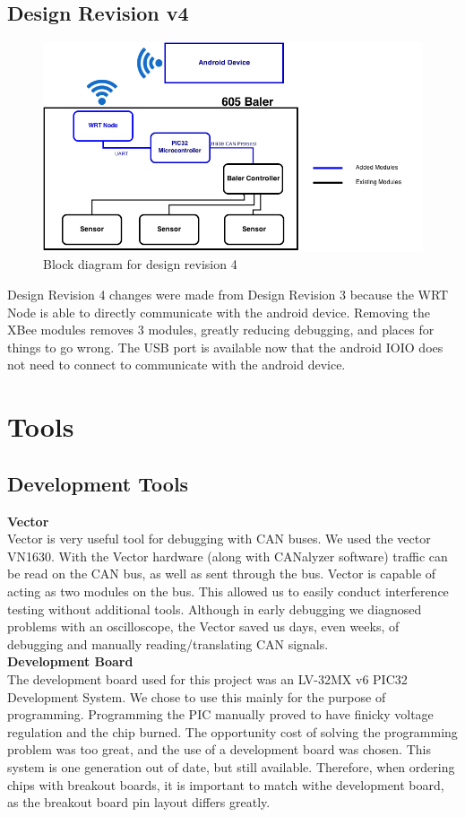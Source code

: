 \documentclass[paper=a4, fontsize=11pt]{scrartcl}
\numberwithin{equation}{section}		%
\numberwithin{figure}{section}			%
\numberwithin{table}{section}				%
\begin{document}
\subsection{Design Revision v4} 
 \begin{figure}[ht]
	 \center\includegraphics[scale=0.5]{rev4.png}
 \caption{Block diagram for design revision 4}
 \end{figure}
Design Revision 4 changes were made from Design Revision 3 because the WRT Node is able to directly communicate with the android device. Removing the XBee modules removes 3 modules, greatly reducing debugging, and places for things to go wrong. The USB port is available now that the android IOIO does not need to connect to communicate with the android device.\\

\section{Tools}
\subsection{Development Tools}
\textbf{Vector}\\
Vector is very useful tool for debugging with CAN buses. We used the vector VN1630. With the Vector hardware (along with CANalyzer software) traffic can be read on the CAN bus, as well as sent through the bus. Vector is capable of acting as two modules on the bus. This allowed us to easily conduct interference testing without additional tools. Although in early debugging we diagnosed problems with an oscilloscope, the Vector saved us days, even weeks, of debugging and manually reading/translating CAN signals.\\

\textbf{Development Board}\\
The development board used for this project was an LV-32MX v6 PIC32 Development System. We chose to use this mainly for the purpose of programming. Programming the PIC manually proved to have finicky voltage regulation and the chip burned. The opportunity cost of solving the programming problem was too great, and the use of a development board was chosen. This system is one generation out of date, but still available. Therefore, when ordering chips with breakout boards, it is important to match withe development board, as the breakout board pin layout differs greatly.\\
\end{document}
